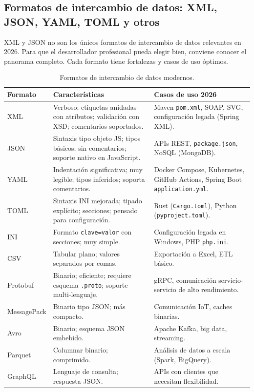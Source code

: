 \documentclass[11pt,a4paper,openany]{book}
\begin{document}
\subsection{Formatos de intercambio de datos: XML, JSON, YAML, TOML y otros}

XML y JSON no son los únicos formatos de intercambio de datos
relevantes en 2026. Para que el desarrollador profesional pueda
elegir bien, conviene conocer el panorama completo. Cada formato
tiene fortalezas y casos de uso óptimos.

\begin{table}[htbp]
\centering
\caption{Formatos de intercambio de datos modernos.}
\label{tab:formatos-datos}
\footnotesize
\begin{tabularx}{\textwidth}{lXX}
\toprule
\textbf{Formato} & \textbf{Características} & \textbf{Casos de uso 2026}\\
\midrule
XML & Verboso; etiquetas anidadas con atributos; validación con XSD; comentarios soportados. & Maven \texttt{pom.xml}, SOAP, SVG, configuración legada (Spring XML).\\
JSON & Sintaxis tipo objeto JS; tipos básicos; sin comentarios; soporte nativo en JavaScript. & APIs REST, \texttt{package.json}, NoSQL (MongoDB).\\
YAML & Indentación significativa; muy legible; tipos inferidos; soporta comentarios. & Docker Compose, Kubernetes, GitHub Actions, Spring Boot \texttt{application.yml}.\\
TOML & Sintaxis INI mejorada; tipado explícito; secciones; pensado para configuración. & Rust (\texttt{Cargo.toml}), Python (\texttt{pyproject.toml}).\\
INI & Formato \texttt{clave=valor} con secciones; muy simple. & Configuración legada en Windows, PHP \texttt{php.ini}.\\
CSV & Tabular plano; valores separados por comas. & Exportación a Excel, ETL básico.\\
Protobuf & Binario; eficiente; requiere esquema \texttt{.proto}; soporte multi-lenguaje. & gRPC, comunicación servicio-servicio de alto rendimiento.\\
MessagePack & Binario tipo JSON; más compacto. & Comunicación IoT, caches binarias.\\
Avro & Binario; esquema JSON embebido. & Apache Kafka, big data, streaming.\\
Parquet & Columnar binario; comprimido. & Análisis de datos a escala (Spark, BigQuery).\\
GraphQL & Lenguaje de consulta; respuesta JSON. & APIs con clientes que necesitan flexibilidad.\\
\bottomrule
\end{tabularx}
\end{table}
\end{document}
